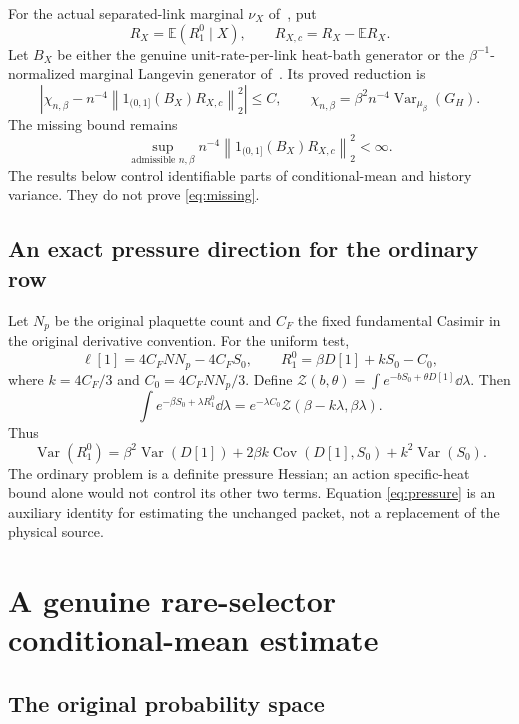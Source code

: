 \documentclass[11pt,letterpaper]{article}
\theoremstyle{remark}\newtheorem{remark}[theorem]{Remark}
\newcommand{\E}{\mathbb E}
\newcommand{\Var}{\operatorname{Var}}\newcommand{\Cov}{\operatorname{Cov}}
\newcommand{\norm}[1]{\left\lVert#1\right\rVert}
\begin{document}
For the actual separated-link marginal \(\nu_X\) of~\cite[\S\S3--5]{SZ}, put
\[
 R_X=\E(R_1^0\mid X),\qquad R_{X,c}=R_X-\E R_X.
\]
Let \(B_X\) be either the genuine unit-rate-per-link heat-bath generator or the \(\beta^{-1}\)-normalized marginal Langevin generator of~\cite[\S2.2]{OS}. Its proved reduction is
\begin{equation}\label{eq:main}
 \boxed{\quad
 \left|\chi_{n,\beta}
 -n^{-4}\norm{1_{(0,1]}(B_X)R_{X,c}}_2^2\right|\le C,\qquad
 \chi_{n,\beta}=\beta^2n^{-4}\Var_{\mu_\beta}(G_H).
 \quad}
\end{equation}
The missing bound remains
\begin{equation}\label{eq:missing}
 \sup_{\text{admissible }n,\beta}
 n^{-4}\norm{1_{(0,1]}(B_X)R_{X,c}}_2^2<\infty.
\end{equation}
The results below control identifiable parts of conditional-mean and history variance. They do not prove \eqref{eq:missing}.

\subsection{An exact pressure direction for the ordinary row}

Let \(N_p\) be the original plaquette count and \(C_F\) the fixed fundamental Casimir in the original derivative convention. For the uniform test,
\[
 \ell[1]=4C_FN N_p-4C_FS_0,\qquad
 R_1^0=\beta D[1]+kS_0-C_0,
\]
where \(k=4C_F/3\) and \(C_0=4C_FN N_p/3\). Define
\(\mathcal Z(b,\theta)=\int e^{-bS_0+\theta D[1]}\dd\lambda\). Then
\begin{equation}\label{eq:pressure}
 \int e^{-\beta S_0+\lambda R_1^0}\dd\lambda
 =e^{-\lambda C_0}\mathcal Z(\beta-k\lambda,\beta\lambda).
\end{equation}
Thus
\[
 \Var(R_1^0)=\beta^2\Var(D[1])
 +2\beta k\Cov(D[1],S_0)+k^2\Var(S_0).
\]
The ordinary problem is a definite pressure Hessian; an action specific-heat bound alone would not control its other two terms. Equation \eqref{eq:pressure} is an auxiliary identity for estimating the unchanged packet, not a replacement of the physical source.

\section{A genuine rare-selector conditional-mean estimate}

\subsection{The original probability space}
\end{document}
